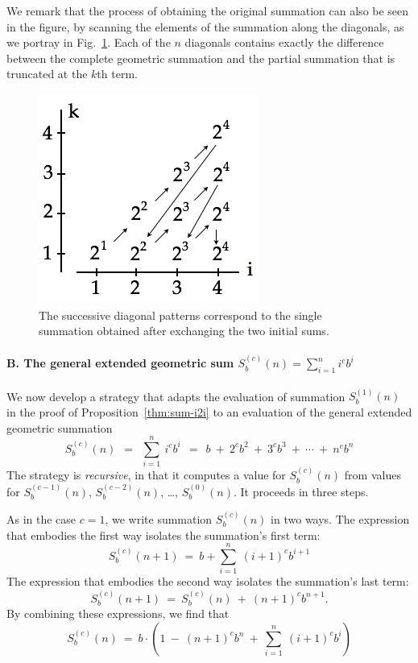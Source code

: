 We remark that the process of obtaining the original summation can
also be seen in the figure, by scanning the elements of the summation
along the diagonals, as we portray in Fig.~\ref{fig:Sumi2iDiag}.  Each
of the $n$ diagonals contains exactly the difference between the
complete geometric summation and the partial summation that is
truncated at the $k$th term.
\begin{figure}[htb]
\centerline{
\includegraphics[scale=0.3]{FiguresMaths/Sumi2iDiag}
}
\caption{The successive diagonal patterns correspond to the single summation obtained after exchanging the two initial sums.}
\label{fig:Sumi2iDiag}
\end{figure}

\smallskip

\paragraph{\small\sf B. The general extended geometric sum $S^{(c)}_b(n) =
  \sum_{i=1}^n i^c b^i$}

We now develop a strategy that adapts the evaluation of summation
$S_b^{(1)}(n)$ in the proof of Proposition~\ref{thm:sum-i2i} to an
evaluation of the general extended geometric summation
\[
S_b^{(c)}(n) \ \ = \ \ \sum_{i=1}^n \ i^c b^i
 \ \ = \ \
b \ + \ 2^{c} b^2\ + \ 3^{c} b^3 \ + \ \cdots \ + \ n^{c} b^{n}
\]
The strategy is {\em recursive}, in that it computes a value for
$S^{(c)}_b(n)$ from values for $S^{(c-1)}_b(n)$, $S^{(c-2)}_b(n)$,
\ldots, $S^{(0)}_b(n)$.  It proceeds in three steps.

%
As in the case $c=1$, we write summation $S_b^{(c)}(n)$ in two ways.
The expression that embodies the first way isolates the summation's
first term:
\[ S_b^{(c)}(n+1) \ = \ b + \sum_{i=1}^n \ (i+1)^c b^{i+1} \]
The expression that embodies the second way isolates the summation's
last term:
\[ S_b^{(c)}(n+1) \ = \ S_b^{(c)}(n) \ + \ (n+1)^{c} b^{n+1}. \]
By combining these expressions, we find that
\begin{equation}
\label{eq:Sbcn-1}
S_b^{(c)}(n) 
 \ = \
b \cdot \left(
1 \ - \
(n+1)^{c} b^{n} \ + \
 \sum_{i=1}^n \ (i+1)^c b^{i} 
\right)
\end{equation}


